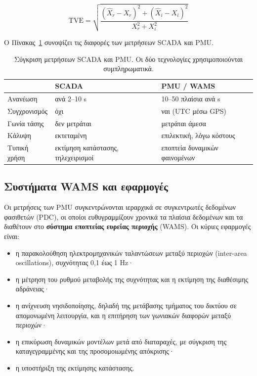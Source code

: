 \begin{equation}
\mathrm{TVE} = \sqrt{\frac{(\hat{X}_r - X_r)^2 + (\hat{X}_i - X_i)^2}{X_r^2 + X_i^2}}
\label{eq:tve}
\end{equation}

Ο Πίνακας~\ref{tab:scada-pmu} συνοψίζει τις διαφορές των μετρήσεων SCADA και PMU.

\begin{table}[!htbp]
\centering
\begin{tabular}{lll}
\hline
 & SCADA & PMU / WAMS \\
\hline
Ανανέωση         & ανά 2--10 s        & 10--50 πλαίσια ανά s \\
Συγχρονισμός     & όχι                & ναι (UTC μέσω GPS) \\
Γωνία τάσης      & δεν μετράται       & μετράται άμεσα \\
Κάλυψη           & εκτεταμένη         & επιλεκτική, λόγω κόστους \\
Τυπική χρήση     & εκτίμηση κατάστασης, τηλεχειρισμοί & εποπτεία δυναμικών φαινομένων \\
\hline
\end{tabular}
\caption{Σύγκριση μετρήσεων SCADA και PMU. Οι δύο τεχνολογίες χρησιμοποιούνται
συμπληρωματικά.}
\label{tab:scada-pmu}
\end{table}

\subsection{Συστήματα WAMS και εφαρμογές}

Οι μετρήσεις των PMU συγκεντρώνονται ιεραρχικά σε συγκεντρωτές δεδομένων φασιθετών (PDC), οι
οποίοι ευθυγραμμίζουν χρονικά τα πλαίσια δεδομένων και τα διαθέτουν στο \textbf{σύστημα
εποπτείας ευρείας περιοχής} (WAMS). Οι κύριες εφαρμογές είναι:

\begin{itemize}
\item η παρακολούθηση ηλεκτρομηχανικών ταλαντώσεων μεταξύ περιοχών (inter-area
      oscillations), συχνότητας 0,1 έως 1 Hz·
\item η μέτρηση του ρυθμού μεταβολής της συχνότητας και η εκτίμηση της διαθέσιμης
      αδράνειας·
\item η ανίχνευση νησιδοποίησης, δηλαδή της μετάβασης τμήματος του δικτύου σε απομονωμένη
      λειτουργία, και η επιτήρηση των γωνιακών διαφορών μεταξύ περιοχών·
\item η επικύρωση δυναμικών μοντέλων μετά από διαταραχές, με σύγκριση της καταγεγραμμένης
      και της προσομοιωμένης απόκρισης·
\item η υποστήριξη της εκτίμησης κατάστασης.
\end{itemize}

